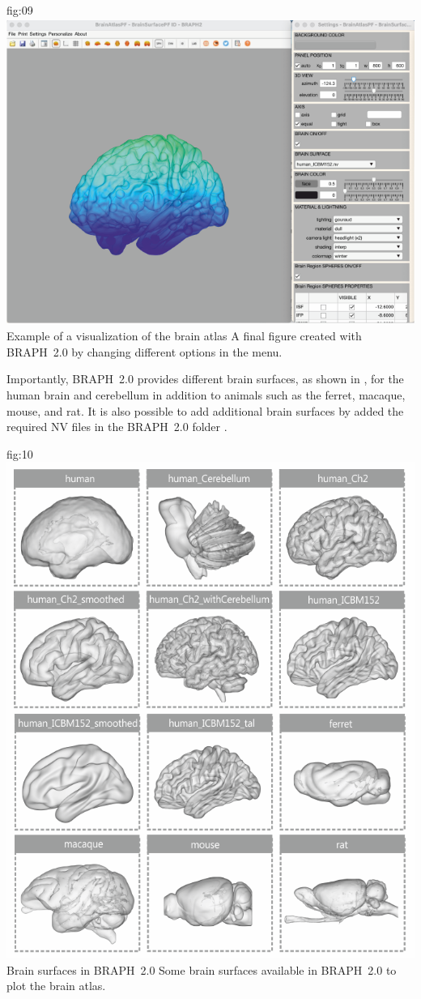\documentclass[justified]{tufte-handout}
\begin{document}
	{fig:09}
	{\includegraphics[height=10cm]{fig09.png}}
	{Example of a visualization of the brain atlas}
	{
	A final figure created with BRAPH~2.0 by changing different options in the menu.
	}

Importantly, BRAPH~2.0 provides different brain surfaces, as shown in , for the human brain and cerebellum in addition to animals such as the ferret, macaque, mouse, and rat.
It is also possible to add additional brain surfaces by added the required NV files in the BRAPH~2.0 folder .

	{fig:10}
	{\includegraphics{fig10.png}}
	{Brain surfaces in BRAPH~2.0}
	{
	Some brain surfaces available in BRAPH~2.0 to plot the brain atlas.
	}
\end{document}
